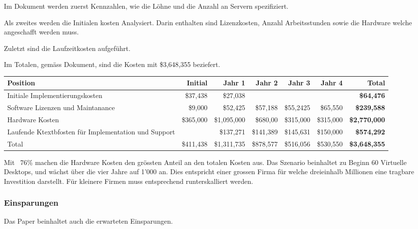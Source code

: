 Im Dokument werden zuerst Kennzahlen, wie die Löhne und die Anzahl an Servern spezifiziert.

Als zweites werden die Initialen kosten Analysiert. Darin enthalten sind Lizenzkosten, Anzahl Arbeitsstunden sowie die Hardware welche angeschafft werden muss.

Zuletzt sind die Laufzeitkosten aufgeführt.

Im Totalen, gemäss Dokument, sind die Kosten mit \$3,648,355 beziefert. 

\begin{table}[H]
	\centering
	\small\renewcommand{\arraystretch}{1.4}  
	\begin{tabularx}{\textwidth}{X | r | r | r | r | r | r}
		\hline
		\rowcolor{tableheadcolor}
		\textbf{Position} & \textbf{Initial} & \textbf{Jahr 1} & \textbf{Jahr 2} & \textbf{Jahr 3} & \textbf{Jahr 4} & \textbf{Total} \\
		\hline
		Initiale Implementierungskosten & \$37,438 & \$27,038 &  &  &  & \textbf{\$64,476} \\
		Software Lizenzen und \linebreak
		Maintanance & \$9,000 & \$52,425 & \$57,188 & \$55,2425 & \$65,550 & \textbf{\$239,588} \\
		Hardware Kosten & \$365,000 & \$1,095,000 & \$680,00 & \$315,000 & \$315,000 & \textbf{\$2,770,000} \\
		Laufende Ktextbfosten für \linebreak
		Implementation und Support &  & \$137,271 & \$141,389 & \$145,631 & \$150,000 & \textbf{\$574,292} \\
		\hline
		\rowcolor{tableheadcolor}
		Total & \$411,438 & \$1,311,735 & \$878,577 & \$516,056 & \$530,550 & \textbf{\$3,648,355} \\
	\end{tabularx}
\end{table}

Mit ~76\% machen die Hardware Kosten den grössten Anteil an den totalen Kosten aus.
Das Szenario beinhaltet zu Beginn 60 Virtuelle Desktops, und wächst über die vier Jahre auf 1'000 an. Dies entspricht einer grossen Firma für welche dreieinhalb Millionen eine tragbare Investition darstellt. Für kleinere Firmen muss entsprechend runterskalliert werden.

\subsubsection{Einsparungen}
Das Paper beinhaltet auch die erwarteten Einsparungen.

